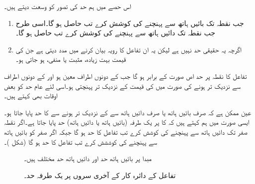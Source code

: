 اس حصے میں ہم حد کی تصور کو وسعت دیتے ہیں۔
\begin{enumerate}[1.]
\item
{} جب  نقطہ  تک بائیں ہاتھ سے پہنچنے کی کوشش کرے تب  حاصل ہو گا۔اسی طرح جب  نقطہ  تک دائیں ہاتھ سے پہنچنے کی کوشش کرے تب  حاصل ہو گا۔
\item
{} اگرچہ یہ حقیقی حد نہیں ہے لیکن یہ ان تفاعل کا رویہ بیان کرنے میں مدد دیتی ہے جن کی قیمت بہت زیادہ، مثبت یا منفی، ہو جاتی ہو۔  
\end{enumerate}

تفاعل  کا نقطہ  پر حد اص صورت  کے برابر ہو گا جب  کے دونوں اطراف  معین ہو اور  کے دونوں اطراف سے نزدیک تر ہونے کی صورت میں  کی قیمت  کے نزدیک تر پہنچتی ہو۔اسی لئے عام حد کو بعض اوقات  بھی کہتے ہیں۔

عین ممکن ہے کہ صرف بائیں ہاتھ یا صرف دائیں ہاتھ سے   کے نزدیک تر ہونے سے  کا حد پایا جاتا ہو۔ایسی صورت میں ہم کہتے ہیں کہ  کا  پر یک طرفہ (بائیں ہاتھ یا دائیں ہاتھ)  حد پایا جاتا ہے۔اگر  نقطہ صفر تک دائیں ہاتھ سے پہنچنے کی کوشش کرے تب تفاعل  کا حد  ہو گا جبکہ اگر صفر کو  بائیں ہاتھ سے پہنچنے کی کوششش کرے تب تفاعل کا حد  ہو گا (شکل )۔
\begin{figure}
\centering
\begin{minipage}{0.45\textwidth}
\centering
{}
\caption{مبدا پر بائیں ہاتھ حد اور دائیں ہاتھ حد مختلف ہیں۔}
\label{شکل_حد_دایاں_بایاں_مختلف}
\end{minipage}\hfill
\begin{minipage}{0.45\textwidth}
\centering
{}
\caption{تفاعل کے دائرہ کار کے آخری سروں پر یک طرفہ حد۔}
\label{شکل_حد_دایاں_بایاں_مختلف_نصف_دائرہ}
\end{minipage}%
\end{figure}

